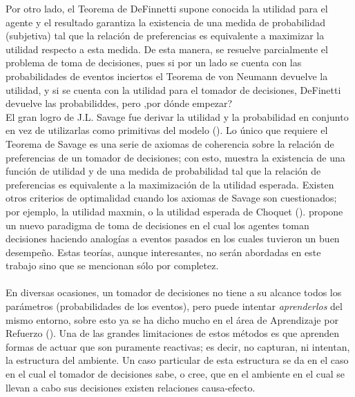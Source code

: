 \documentclass[11pt]{article}
\theoremstyle{plain}
\begin{document}
\indent Por otro lado, el Teorema de DeFinnetti supone conocida la utilidad para el agente y el resultado garantiza la existencia de una medida de probabilidad (subjetiva) tal que la relación de preferencias es equivalente a maximizar la utilidad respecto a esta medida. De esta manera, se resuelve parcialmente el problema de toma de decisiones, pues si por un lado se cuenta con las probabilidades de eventos inciertos el Teorema de von Neumann devuelve la utilidad, y si se cuenta con la utilidad para el tomador de decisiones, DeFinetti devuelve las probabiliddes, pero ‚por dónde empezar?  
\\
\indent El gran logro de J.L. Savage fue derivar  la utilidad y la probabilidad en conjunto en vez de utilizarlas como primitivas del modelo (\cite{gilboa2009decision}). Lo único que requiere el Teorema de Savage es una serie de axiomas de coherencia sobre la relación de preferencias de un tomador de decisiones; con esto, muestra la existencia de una función de utilidad y de una medida de probabilidad tal que la relación de preferencias es equivalente a la maximización de la utilidad esperada. Existen otros criterios de optimalidad cuando los axiomas de Savage son cuestionados; por ejemplo, la utilidad maxmin, o la utilidad esperada de Choquet (\cite{gilboa2009decision}). \cite{gilboa2001theory} propone un nuevo paradigma de toma de decisiones en el cual los agentes toman decisiones haciendo analogías a eventos pasados en los cuales tuvieron un buen desempeño. Estas teorías, aunque interesantes, no serán abordadas en este trabajo sino que se mencionan sólo por completez.\\
\\
\indent En diversas ocasiones, un tomador de decisiones no tiene a su alcance todos los parámetros (probabilidades de los eventos), pero puede intentar \textit{aprenderlos} del mismo entorno, sobre esto ya se ha dicho mucho en el área de Aprendizaje por Refuerzo (\cite{sutton1998reinforcement}). Una de las grandes limitaciones de estos métodos es que aprenden formas de actuar que son puramente reactivas; es decir, no capturan, ni intentan, la estructura del ambiente. Un caso particular de esta estructura se da en el caso en el cual el tomador de decisiones sabe, o cree, que en el ambiente en el cual se llevan a cabo sus decisiones existen relaciones causa-efecto.
\end{document}
